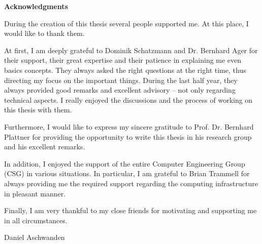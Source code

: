 

\clearpage 
\begin{center}
	\textbf{Acknowledgments} 
\end{center}

During the creation of this thesis several people supported me. At this place, I would like to thank them.

At first, I am deeply grateful to Dominik Schatzmann and Dr. Bernhard Ager for their support, their great expertise and their patience in explaining me even basics concepts. They always asked the right questions at the right time, thus directing my focus on the important things. During the last half year, they always provided good remarks and excellent advisory -- not only regarding technical aspects. I really enjoyed the discussions and the process of working on this thesis with them. 

Furthermore, I would like to express my sincere gratitude to Prof. Dr. Bernhard Plattner for providing the opportunity to write this thesis in his research group and his excellent remarks. 

In addition, I enjoyed the support of the entire Computer Engineering Group (CSG) in various situations. In particular, I am grateful to Brian Trammell for always providing me the required support regarding the computing infrastructure in pleasant manner. 

Finally, I am very thankful to my close friends for motivating and supporting me in all circumstances.

\vspace{1cm} Daniel Aschwanden 
\vfil

